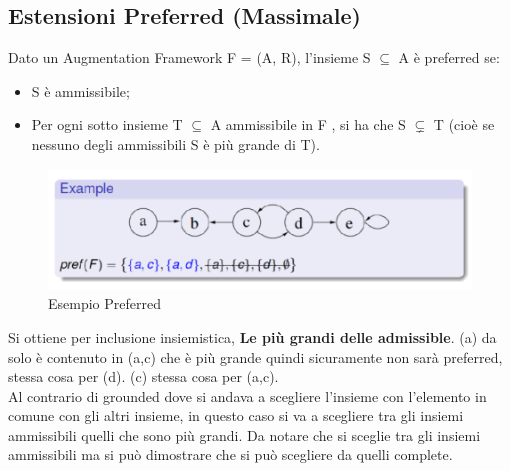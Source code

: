 \subsection{Estensioni Preferred (Massimale)}
Dato un Augmentation Framework F = (A, R), l'insieme S $\subseteq$ A è preferred
se:
\begin{itemize}
    \item S è ammissibile;
    \item Per ogni sotto insieme T $\subseteq$ A ammissibile in F , si ha che S
          $\subsetneq$ T (cioè se nessuno degli ammissibili S è più grande di T).
\end{itemize}
\begin{figure}[htp]
    \centering
    \includegraphics[width=12cm, keepaspectratio]{capitoli/img/Cap6/prefered.png}
    \caption{Esempio Preferred}
\end{figure}
Si ottiene per inclusione insiemistica, \textbf{Le più grandi delle admissible}.
(a) da solo è contenuto in (a,c) che è più grande quindi sicuramente non sarà
preferred, stessa cosa per (d). (c) stessa cosa per (a,c). \\Al contrario di
grounded dove si andava a scegliere l'insieme con l'elemento in comune con gli
altri insieme, in questo caso si va a scegliere tra gli insiemi ammissibili
quelli che sono più grandi. Da notare che si sceglie tra gli insiemi ammissibili
ma si può dimostrare che si può scegliere da quelli complete.

